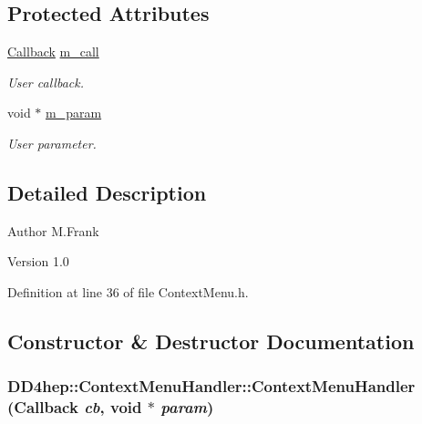 \subsection*{Protected Attributes}
\begin{DoxyCompactItemize}
\item 
\hyperlink{class_d_d4hep_1_1_callback}{Callback} \hyperlink{class_d_d4hep_1_1_context_menu_handler_a28f1c56b0623ef052bb8647004acc5a7}{m\_\-call}
\begin{DoxyCompactList}\small\item\em User callback. \item\end{DoxyCompactList}\item 
void $\ast$ \hyperlink{class_d_d4hep_1_1_context_menu_handler_a87e20729498769077b9fb5a668fdf410}{m\_\-param}
\begin{DoxyCompactList}\small\item\em User parameter. \item\end{DoxyCompactList}\end{DoxyCompactItemize}


\subsection{Detailed Description}
\begin{DoxyAuthor}{Author}
M.Frank 
\end{DoxyAuthor}
\begin{DoxyVersion}{Version}
1.0 
\end{DoxyVersion}


Definition at line 36 of file ContextMenu.h.

\subsection{Constructor \& Destructor Documentation}
\hypertarget{class_d_d4hep_1_1_context_menu_handler_a55e7ee588a28189cb0766e1399d6b0c0}{
\subsubsection[{ContextMenuHandler}]{\setlength{\rightskip}{0pt plus 5cm}DD4hep::ContextMenuHandler::ContextMenuHandler ({\bf Callback} {\em cb}, \/  void $\ast$ {\em param})}}
\label{class_d_d4hep_1_1_context_menu_handler_a55e7ee588a28189cb0766e1399d6b0c0}


